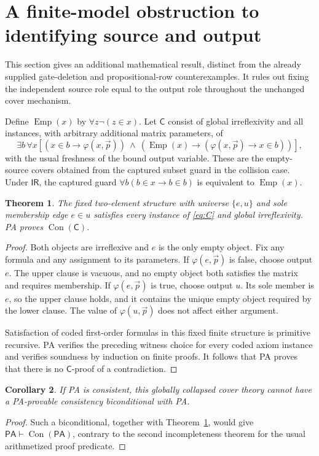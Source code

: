 \documentclass[11pt,a4paper]{article}
\newcommand{\PA}{\mathsf{PA}}
\newcommand{\CC}{\mathsf{C}}
\newcommand{\Con}{\operatorname{Con}}
\newcommand{\Emp}{\operatorname{Emp}}
\newcommand{\IR}{\mathsf{IR}}
\newtheorem{theorem}{Theorem}[section]
\newtheorem{corollary}[theorem]{Corollary}
\begin{document}
\section{A finite-model obstruction to identifying source and output}\label{sec:collision}

This section gives an additional mathematical result, distinct from the
already supplied gate-deletion and propositional-row counterexamples.
It rules out fixing the independent source role equal to the output role
throughout the unchanged cover mechanism.

Define $\Emp(x)$ by $\forall z\neg(z\in x)$. Let $\CC$ consist of global
irreflexivity and all instances, with arbitrary additional matrix
parameters, of
\begin{equation}\label{eq:C}
\exists b\,\forall x\left[
 (x\in b\to\varphi(x,\vec p))\ \land\
 (\Emp(x)\to(\varphi(x,\vec p)\to x\in b))\right],
\end{equation}
with the usual freshness of the bound output variable. These are the
empty-source covers obtained from the captured subset guard in the
collision case. Under $\IR$, the captured guard
$\forall b(b\in x\to b\in b)$ is equivalent to $\Emp(x)$.

\begin{theorem}\label{thm:collision}
The fixed two-element structure with universe $\{e,u\}$ and sole
membership edge $e\in u$ satisfies every instance of \eqref{eq:C} and
global irreflexivity. PA proves $\Con(\CC)$.
\end{theorem}
\begin{proof}
Both objects are irreflexive and $e$ is the only empty object. Fix any
formula and any assignment to its parameters. If $\varphi(e,\vec p)$ is
false, choose output $e$. The upper clause is vacuous, and no empty object
both satisfies the matrix and requires membership. If
$\varphi(e,\vec p)$ is true, choose output $u$. Its sole member is $e$,
so the upper clause holds, and it contains the unique empty object
required by the lower clause. The value of $\varphi(u,\vec p)$ does not
affect either argument.

Satisfaction of coded first-order formulas in this fixed finite structure
is primitive recursive. PA verifies the preceding witness choice for every
coded axiom instance and verifies soundness by induction on finite proofs.
It follows that PA proves that there is no $\CC$-proof of a contradiction.
\end{proof}

\begin{corollary}
If PA is consistent, this globally collapsed cover theory cannot have a
PA-provable consistency biconditional with PA.
\end{corollary}
\begin{proof}
Such a biconditional, together with Theorem~\ref{thm:collision}, would give
$\PA\vdash\Con(\PA)$, contrary to the second incompleteness theorem for
the usual arithmetized proof predicate.
\end{proof}
\end{document}
